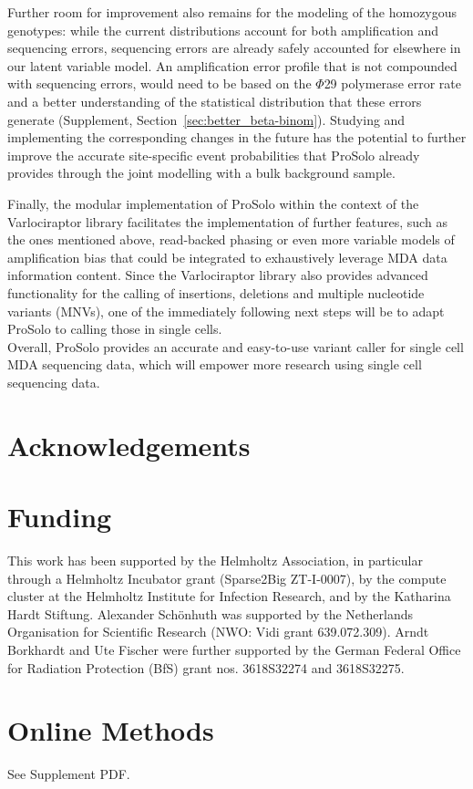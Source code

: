 \documentclass[fleqn,12pt,inline]{wlscirep}
\begin{document}
Further room for improvement also remains for the modeling of the homozygous genotypes: while the current distributions account for both amplification and sequencing errors, sequencing errors are already safely accounted for elsewhere in our latent variable model.
An amplification error profile that is not compounded with sequencing errors, would need to be based on the $\Phi$29 polymerase error rate and a better understanding of the statistical distribution that these errors generate (Supplement, Section~\ref{sec:better_beta-binom}).
Studying and implementing the corresponding changes in the future has the potential to further improve the accurate site-specific event probabilities that ProSolo already provides through the joint modelling with a bulk background sample.

Finally, the modular implementation of ProSolo within the context of the Varlociraptor library\cite{koster_enhancing_2019} facilitates the implementation of further features, such as the ones mentioned above, read-backed phasing\cite{bohrson_linked-read_2019,hard_conbase:_2019} or even more variable models of amplification bias\cite{luquette_identification_2019} that could be integrated to exhaustively leverage MDA data information content.
Since the Varlociraptor library also provides advanced functionality for the calling of insertions, deletions and multiple nucleotide variants (MNVs), one of the immediately following next steps will be to adapt ProSolo to calling those in single cells.\\

Overall, ProSolo provides an accurate and easy-to-use variant caller for single cell MDA sequencing data, which will empower more research using single cell sequencing data.



\section*{Acknowledgements}

\section*{Funding}
This work has been supported by the Helmholtz Association, in particular through a Helmholtz Incubator grant (Sparse2Big ZT-I-0007), by the compute cluster at the Helmholtz Institute for Infection Research, and by the Katharina Hardt Stiftung. Alexander Schönhuth was supported by the Netherlands Organisation for Scientific Research (NWO: Vidi grant 639.072.309). Arndt Borkhardt and Ute Fischer were further supported by the German Federal Office for Radiation Protection (BfS) grant nos. 3618S32274 and 3618S32275.

\section{Online Methods}
See Supplement PDF.
\end{document}
